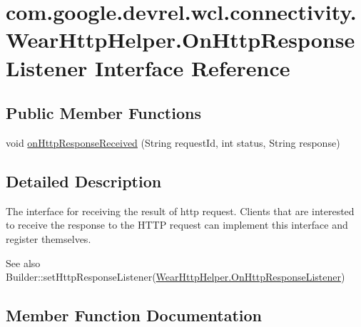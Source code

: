 \hypertarget{interfacecom_1_1google_1_1devrel_1_1wcl_1_1connectivity_1_1WearHttpHelper_1_1OnHttpResponseListener}{}\section{com.\+google.\+devrel.\+wcl.\+connectivity.\+Wear\+Http\+Helper.\+On\+Http\+Response\+Listener Interface Reference}
\label{interfacecom_1_1google_1_1devrel_1_1wcl_1_1connectivity_1_1WearHttpHelper_1_1OnHttpResponseListener}
\subsection*{Public Member Functions}
\begin{DoxyCompactItemize}
\item 
void \hyperlink{interfacecom_1_1google_1_1devrel_1_1wcl_1_1connectivity_1_1WearHttpHelper_1_1OnHttpResponseListener_a4a50a3e8b12bfdc0be91232a1e7b4ac9}{on\+Http\+Response\+Received} (String request\+Id, int status, String response)
\end{DoxyCompactItemize}


\subsection{Detailed Description}
The interface for receiving the result of http request. Clients that are interested to receive the response to the H\+T\+TP request can implement this interface and register themselves.

\begin{DoxySeeAlso}{See also}
Builder\+::set\+Http\+Response\+Listener(\hyperlink{interfacecom_1_1google_1_1devrel_1_1wcl_1_1connectivity_1_1WearHttpHelper_1_1OnHttpResponseListener}{Wear\+Http\+Helper.\+On\+Http\+Response\+Listener}) 
\end{DoxySeeAlso}


\subsection{Member Function Documentation}
